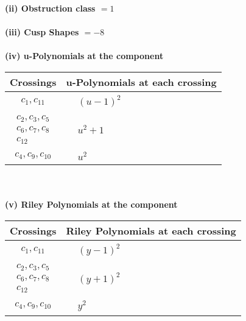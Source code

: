 \documentclass[1p]{elsarticle_modified}
\theoremstyle{definition}
\begin{document}
\flushleft \textbf{(ii) Obstruction class $= 1$}\\~\\
\flushleft \textbf{(iii) Cusp Shapes $= -8$}\\~\\
\newpage\renewcommand{\arraystretch}{1}
\flushleft \textbf{(iv) u-Polynomials at the component}\newline \\
\begin{tabular}{m{50pt}|m{274pt}}
Crossings & \hspace{64pt}u-Polynomials at each crossing \\
\hline $$\begin{aligned}c_{1},c_{11}\end{aligned}$$&$\begin{aligned}
&(u-1)^2
\end{aligned}$\\
\hline $$\begin{aligned}c_{2},c_{3},c_{5}\\c_{6},c_{7},c_{8}\\c_{12}\end{aligned}$$&$\begin{aligned}
&u^2+1
\end{aligned}$\\
\hline $$\begin{aligned}c_{4},c_{9},c_{10}\end{aligned}$$&$\begin{aligned}
&u^2
\end{aligned}$\\
\hline
\end{tabular}\\~\\
\newpage\renewcommand{\arraystretch}{1}
\flushleft \textbf{(v) Riley Polynomials at the component}\newline \\
\begin{tabular}{m{50pt}|m{274pt}}
Crossings & \hspace{64pt}Riley Polynomials at each crossing \\
\hline $$\begin{aligned}c_{1},c_{11}\end{aligned}$$&$\begin{aligned}
&(y-1)^2
\end{aligned}$\\
\hline $$\begin{aligned}c_{2},c_{3},c_{5}\\c_{6},c_{7},c_{8}\\c_{12}\end{aligned}$$&$\begin{aligned}
&(y+1)^2
\end{aligned}$\\
\hline $$\begin{aligned}c_{4},c_{9},c_{10}\end{aligned}$$&$\begin{aligned}
&y^2
\end{aligned}$\\
\hline
\end{tabular}\\~\\
\end{document}
